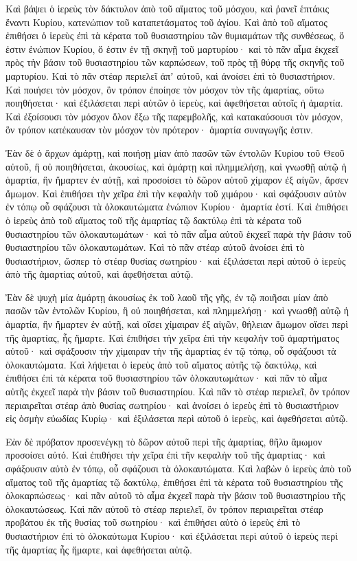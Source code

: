 {Καὶ βάψει ὁ ἱερεὺς τὸν δάκτυλον ἀπὸ τοῦ αἵματος τοῦ μόσχου, καὶ ῥανεῖ ἑπτάκις ἔναντι Κυρίου, κατενώπιον τοῦ καταπετάσματος τοῦ ἁγίου.
Καὶ ἀπὸ τοῦ αἵματος ἐπιθήσει ὁ ἱερεὺς ἐπὶ τὰ κέρατα τοῦ θυσιαστηρίου τῶν θυμιαμάτων τῆς συνθέσεως, ὅ ἐστιν ἐνώπιον Κυρίου, ὅ ἐστιν ἐν τῇ σκηνῇ τοῦ μαρτυρίου· καὶ τὸ πᾶν αἷμα ἐκχεεῖ πρὸς τὴν βάσιν τοῦ θυσιαστηρίου τῶν καρπώσεων, τοῦ πρὸς τῇ θύρᾳ τῆς σκηνῆς τοῦ μαρτυρίου.
Καὶ τὸ πᾶν στέαρ περιελεῖ ἀπʼ αὐτοῦ, καὶ ἀνοίσει ἐπὶ τὸ θυσιαστήριον.
Καὶ ποιήσει τὸν μόσχον, ὃν τρόπον ἐποίησε τὸν μόσχον τὸν τῆς ἁμαρτίας, οὕτω ποιηθήσεται· καὶ ἐξιλάσεται περὶ αὐτῶν ὁ ἱερεὺς, καὶ ἀφεθήσεται αὐτοῖς ἡ ἁμαρτία.
Καὶ ἐξοίσουσι τὸν μόσχον ὅλον ἔξω τῆς παρεμβολῆς, καὶ κατακαύσουσι τὸν μόσχον, ὃν τρόπον κατέκαυσαν τὸν μόσχον τὸν πρότερον· ἁμαρτία συναγωγῆς ἐστιν.
\par }{\PP {}Ἐὰν δὲ ὁ ἄρχων ἁμάρτῃ, καὶ ποιήσῃ μίαν ἀπὸ πασῶν τῶν ἐντολῶν Κυρίου τοῦ Θεοῦ αὐτοῦ, ἣ οὐ ποιηθήσεται, ἀκουσίως, καὶ ἁμάρτῃ καὶ πλημμελήσῃ,
καὶ γνωσθῇ αὐτῷ ἡ ἁμαρτία, ἣν ἥμαρτεν ἐν αὐτῇ, καὶ προσοίσει τὸ δῶρον αὐτοῦ χίμαρον ἐξ αἰγῶν, ἄρσεν ἄμωμον.
Καὶ ἐπιθήσει τὴν χεῖρα ἐπὶ τὴν κεφαλὴν τοῦ χιμάρου· καὶ σφάξουσιν αὐτὸν ἐν τόπῳ οὗ σφάζουσι τὰ ὁλοκαυτώματα ἐνώπιον Κυρίου· ἁμαρτία ἐστί.
Καὶ ἐπιθήσει ὁ ἱερεὺς ἀπὸ τοῦ αἵματος τοῦ τῆς ἁμαρτίας τῷ δακτύλῳ ἐπὶ τὰ κέρατα τοῦ θυσιαστηρίου τῶν ὁλοκαυτωμάτων· καὶ τὸ πᾶν αἷμα αὐτοῦ ἐκχεεῖ παρὰ τὴν βάσιν τοῦ θυσιαστηρίου τῶν ὁλοκαυτωμάτων.
Καὶ τὸ πᾶν στέαρ αὐτοῦ ἀνοίσει ἐπὶ τὸ θυσιαστήριον, ὥσπερ τὸ στέαρ θυσίας σωτηρίου· καὶ ἐξιλάσεται περὶ αὐτοῦ ὁ ἱερεὺς ἀπὸ τῆς ἁμαρτίας αὐτοῦ, καὶ ἀφεθήσεται αὐτῷ.
\par }{\PP {}Ἐὰν δὲ ψυχὴ μία ἁμάρτῃ ἀκουσίως ἐκ τοῦ λαοῦ τῆς γῆς, ἐν τῷ ποιῆσαι μίαν ἀπὸ πασῶν τῶν ἐντολῶν Κυρίου, ἣ οὐ ποιηθήσεται, καὶ πλημμελήσῃ·
καὶ γνωσθῇ αὐτῷ ἡ ἁμαρτία, ἣν ἥμαρτεν ἐν αὐτῇ, καὶ οἴσει χίμαιραν ἐξ αἰγῶν, θήλειαν ἄμωμον οἴσει περὶ τῆς ἁμαρτίας, ἧς ἥμαρτε.
Καὶ ἐπιθήσει τὴν χεῖρα ἐπὶ τὴν κεφαλὴν τοῦ ἁμαρτήματος αὐτοῦ· καὶ σφάξουσιν τὴν χίμαιραν τὴν τῆς ἁμαρτίας ἐν τῷ τόπῳ, οὗ σφάζουσι τὰ ὁλοκαυτώματα.
Καὶ λήψεται ὁ ἱερεὺς ἀπὸ τοῦ αἵματος αὐτῆς τῷ δακτύλῳ, καὶ ἐπιθήσει ἐπὶ τὰ κέρατα τοῦ θυσιαστηρίου τῶν ὁλοκαυτωμάτων· καὶ πᾶν τὸ αἷμα αὐτῆς ἐκχεεῖ παρὰ τὴν βάσιν τοῦ θυσιαστηρίου.
Καὶ πᾶν τὸ στέαρ περιελεῖ, ὃν τρόπον περιαιρεῖται στέαρ ἀπὸ θυσίας σωτηρίου· καὶ ἀνοίσει ὁ ἱερεὺς ἐπὶ τὸ θυσιαστήριον εἰς ὀσμὴν εὐωδίας Κυρίῳ· καὶ ἐξιλάσεται περὶ αὐτοῦ ὁ ἱερεὺς, καὶ ἀφεθήσεται αὐτῷ.
\par }{\PP {}Εὰν δὲ πρόβατον προσενέγκῃ τὸ δῶρον αὐτοῦ περὶ τῆς ἁμαρτίας, θῆλυ ἄμωμον προσοίσει αὐτό.
Καὶ ἐπιθήσει τὴν χεῖρα ἐπὶ τῆν κεφαλὴν τοῦ τῆς ἁμαρτίας· καὶ σφάξουσιν αὐτὸ ἐν τόπῳ, οὗ σφάζουσι τὰ ὁλοκαυτώματα.
Καὶ λαβὼν ὁ ἱερεὺς ἀπὸ τοῦ αἵματος τοῦ τῆς ἁμαρτίας τῷ δακτύλῳ, ἐπιθήσει ἐπὶ τὰ κέρατα τοῦ θυσιαστηρίου τῆς ὁλοκαρπώσεως· καὶ πᾶν αὐτοῦ τὸ αἷμα ἐκχεεῖ παρὰ τὴν βάσιν τοῦ θυσιαστηρίου τῆς ὁλοκαυτώσεως.
Καὶ πᾶν αὐτοῦ τὸ στέαρ περιελεῖ, ὃν τρόπον περιαιρεῖται στέαρ προβάτου ἐκ τῆς θυσίας τοῦ σωτηρίου· καὶ ἐπιθήσει αὐτὸ ὁ ἱερεὺς ἐπὶ τὸ θυσιαστήριον ἐπὶ τὸ ὁλοκαύτωμα Κυρίου· καὶ ἐξιλάσεται περὶ αὐτοῦ ὁ ἱερεὺς περὶ τῆς ἁμαρτίας ἧς ἥμαρτε, καὶ ἀφεθήσεται αὐτῷ.

}
